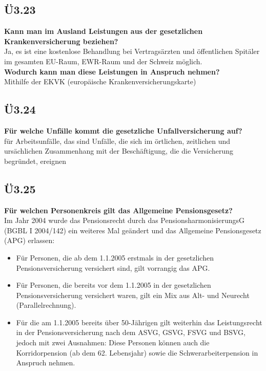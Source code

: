 	\subsection{Ü3.23}
		\textbf{Kann man im Ausland Leistungen aus der gesetzlichen Krankenversicherung beziehen?} \\
		Ja, es ist eine kostenlose Behandlung bei Vertragsärzten und öffentlichen Spitäler im gesamten EU-Raum, EWR-Raum und der Schweiz möglich. \\
		\textbf{Wodurch kann man diese Leistungen in Anspruch nehmen?} \\
		Mithilfe der EKVK (europäische Krankenversicherungskarte) 
	
	\subsection{Ü3.24}
		\textbf{Für welche Unfälle kommt die gesetzliche Unfallversicherung auf?} \\
		für Arbeitsunfälle, das sind Unfälle, die sich im örtlichen, zeitlichen und ursächlichen Zusammenhang mit der Beschäftigung,
		die die Versicherung begründet, ereignen 
		
	\subsection{Ü3.25}
		\textbf{Für welchen Personenkreis gilt das Allgemeine Pensionsgesetz?} \\
		Im Jahr 2004 wurde das Pensionsrecht durch das PensionsharmonisierungsG (BGBL I 2004/142) ein weiteres Mal geändert und das Allgemeine Pensionsgesetz (APG) erlassen:
		
		\begin{itemize}
			\item Für Personen, die ab dem 1.1.2005 erstmals in der gesetzlichen Pensionsversicherung versichert sind, gilt vorrangig das APG.
			\item Für Personen, die bereits vor dem 1.1.2005 in der gesetzlichen Pensionsversicherung versichert waren, gilt ein Mix aus
			Alt- und Neurecht (Parallelrechnung).
			\item Für die am 1.1.2005 bereits über 50-Jährigen gilt weiterhin das Leistungsrecht in der Pensionsversicherung nach dem
			ASVG, GSVG, FSVG und BSVG, jedoch mit zwei Ausnahmen: Diese Personen können auch die Korridorpension (ab
			dem 62. Lebensjahr) sowie die Schwerarbeiterpension in Anspruch nehmen.
		\end{itemize}
		
